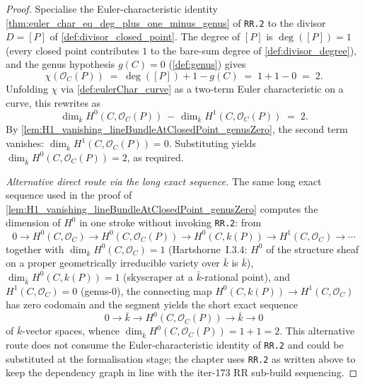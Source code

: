 \begin{proof}
  
  
  
  Specialise the Euler-characteristic identity
  \cref{thm:euler_char_eq_deg_plus_one_minus_genus} of \texttt{RR.2} to
  the divisor \(D = [P]\) of \cref{def:divisor_closed_point}. The
  degree of \([P]\) is \(\deg([P]) = 1\) (every closed point contributes
  \(1\) to the bare-sum degree of \cref{def:divisor_degree}), and the
  genus hypothesis \(g(C) = 0\) (\cref{def:genus}) gives
  \[
    \chi(\mathcal O_C(P)) \;=\; \deg([P]) + 1 - g(C)
    \;=\; 1 + 1 - 0 \;=\; 2.
  \]
  Unfolding \(\chi\) via \cref{def:eulerChar_curve} as a two-term Euler
  characteristic on a curve, this rewrites as
  \[
    \dim_{\bar k} H^0(C, \mathcal O_C(P))
    \,-\, \dim_{\bar k} H^1(C, \mathcal O_C(P))
    \;=\; 2.
  \]
  By
  \cref{lem:H1_vanishing_lineBundleAtClosedPoint_genusZero}, the second
  term vanishes:
  \(\dim_{\bar k} H^1(C, \mathcal O_C(P)) = 0\). Substituting yields
  \(\dim_{\bar k} H^0(C, \mathcal O_C(P)) = 2\), as required.

  \emph{Alternative direct route via the long exact sequence.} The
  same long exact sequence used in the proof of
  \cref{lem:H1_vanishing_lineBundleAtClosedPoint_genusZero} computes
  the dimension of \(H^0\) in one stroke without invoking
  \texttt{RR.2}: from
  \[
    0 \to H^0(C, \mathcal O_C) \to H^0(C, \mathcal O_C(P))
    \to H^0(C, k(P)) \to H^1(C, \mathcal O_C) \to \cdots
  \]
  together with \(\dim_{\bar k} H^0(C, \mathcal O_C) = 1\)
  (Hartshorne~I.3.4: \(H^0\) of the structure sheaf on a proper
  geometrically irreducible variety over \(\bar k\) is \(\bar k\)),
  \(\dim_{\bar k} H^0(C, k(P)) = 1\) (skyscraper at a \(\bar k\)-rational
  point), and \(H^1(C, \mathcal O_C) = 0\) (genus-\(0\)), the connecting
  map \(H^0(C, k(P)) \to H^1(C, \mathcal O_C)\) has zero codomain and the
  segment yields the short exact sequence
  \[
    0 \to \bar k \to H^0(C, \mathcal O_C(P)) \to \bar k \to 0
  \]
  of \(\bar k\)-vector spaces, whence $\dim_{\bar k}
  H^0(C, \mathcal O_C(P)) = 1 + 1 = 2$. This alternative route does
  not consume the Euler-characteristic identity of \texttt{RR.2} and
  could be substituted at the formalisation stage; the chapter uses
  \texttt{RR.2} as written above to keep the dependency graph in
  line with the iter-173 RR sub-build sequencing.
\end{proof}

